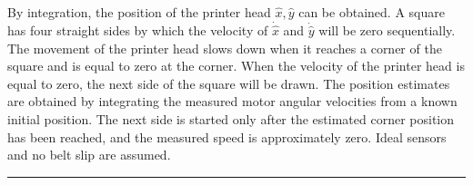 \documentclass[a4paper,11pt]{article}
\begin{document}
By integration, the position of the printer head $\hat{x},\hat{y}$ can be obtained.
A square has four straight sides by which the velocity of $\dot{\hat{x}}$ and $\dot{\hat{y}}$ will be zero sequentially. The movement of the printer head slows down when it reaches a corner of the square and is equal to zero at the corner. When the velocity of the printer head is equal to zero, the next side of the square will be drawn. The position estimates are obtained by integrating the measured motor angular velocities from a known initial position. The next side is started only after the estimated corner position has been reached, and the measured speed is approximately zero. Ideal sensors and no belt slip are assumed.

\par\noindent\rule{\textwidth}{0.4pt}
\printbibliography
\end{document}
